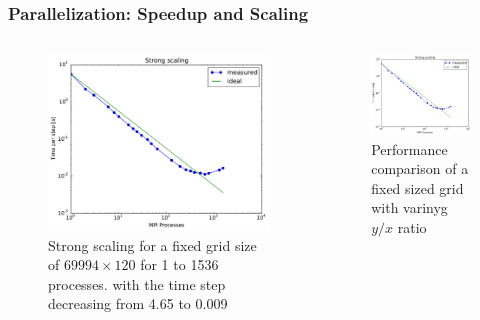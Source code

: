 \documentclass{beamer}
\begin{document}
\begin{frame}
\frametitle{Parallelization: Speedup and Scaling}
\begin{minipage}[1\textheight]{\textwidth}
\begin{columns}[T]
\begin{column}{0.5\textwidth}
\begin{figure}
\includegraphics[width=6.75cm]{strongscale.pdf}
\caption{Strong scaling for a fixed grid size of $69994\times 120$ for 1 to 1536 processes. with the time step decreasing from 4.65 to 0.009}
\end{figure}
\end{column}
\begin{column}{0.5\textwidth}
\begin{figure}
\includegraphics[width=6.75cm]{strongscale.pdf}
\caption{Performance comparison of a fixed sized grid with varinyg $y/x$ ratio}
\end{figure}
\end{column}
\end{columns}
\end{minipage}
\end{frame}
%
%
%
\end{document}
